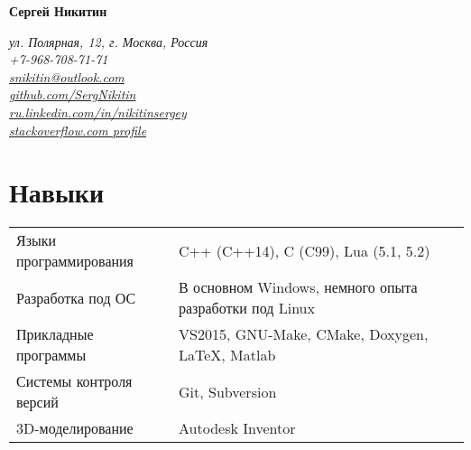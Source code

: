 \documentclass[a4paper, 11pt]{article}
\begin{document}
{\LARGE\textbf{Сергей Никитин}}

\begin{flushright}
    {\itshape
        ул. Полярная, 12, г. Москва, Россия                                                     \\
        +7-968-708-71-71                                                                        \\
        \href{mailto:snikitin@outlook.com}{snikitin@outlook.com}                                \\
        \href{https://github.com/SergNikitin}{github.com/SergNikitin}                           \\
        \href{http://ru.linkedin.com/in/nikitinsergey}{ru.linkedin.com/in/nikitinsergey}        \\
        \href{http://stackoverflow.com/users/3375765/sergey-nikitin}{stackoverflow.com profile} \\
    }
\end{flushright}

\section{Навыки}
\begin{tabular}{ll}
    Языки программирования   & C++ (C++14), C (C99), Lua (5.1, 5.2)                   \\
    Разработка под ОС        & В основном Windows, немного опыта разработки под Linux \\
    Прикладные программы     & VS2015, GNU-Make, CMake, Doxygen, LaTeX, Matlab        \\
    Системы контроля версий  & Git, Subversion                                        \\
    3D-моделирование         & Autodesk Inventor
\end{tabular}
\end{document}
